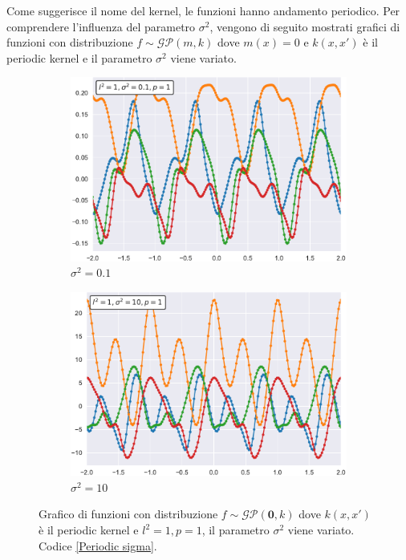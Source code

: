 Come suggerisce il nome del kernel, le funzioni hanno andamento periodico.
Per comprendere l'influenza del parametro $\sigma^2$, vengono di seguito mostrati grafici di funzioni con distribuzione $f\sim \mathcal{GP}(m,k)$ dove $m(x)=0$ e $k(x,x')$ è il periodic kernel e il parametro $\sigma^2$ viene variato.

\begin{figure}[h]
\centering
\begin{subfigure}{.5\textwidth}
  \centering
  \includegraphics[width=\linewidth]{images/Gaussian process/Periodic - sigma=01.pdf}
  \caption{$\sigma^2=0.1$}
\end{subfigure}%
\begin{subfigure}{.5\textwidth}
  \centering
  \includegraphics[width=\linewidth]{images/Gaussian process/Periodic - sigma=10.pdf}
  \caption{$\sigma^2=10$}
\end{subfigure}
\caption{Grafico di funzioni con distribuzione  $f\sim \mathcal{GP}(\bm{0},k)$ dove $k(x,x')$ è il periodic kernel e $l^2=1, p=1$, il parametro $\sigma^2$ viene variato. Codice \ref{Periodic sigma}.}
\label{10 sample periodic modified sigma}
\end{figure}


